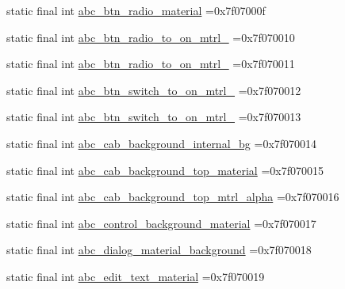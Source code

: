 \begin{DoxyCompactItemize}
\item 
static final int \mbox{\hyperlink{classcom_1_1example_1_1trainawearapplication_1_1_r_1_1drawable_a86ec8f6e96eb8c8e5f4c48fd13214cb6}{abc\+\_\+btn\+\_\+radio\+\_\+material}} =0x7f07000f
\item 
static final int \mbox{\hyperlink{classcom_1_1example_1_1trainawearapplication_1_1_r_1_1drawable_afa1776f1d8f1f59453207683c76dc27f}{abc\+\_\+btn\+\_\+radio\+\_\+to\+\_\+on\+\_\+mtrl\+\_}} =0x7f070010
\item 
static final int \mbox{\hyperlink{classcom_1_1example_1_1trainawearapplication_1_1_r_1_1drawable_a5c54e72bc1da9f1451aabcdb86c208ed}{abc\+\_\+btn\+\_\+radio\+\_\+to\+\_\+on\+\_\+mtrl\+\_}} =0x7f070011
\item 
static final int \mbox{\hyperlink{classcom_1_1example_1_1trainawearapplication_1_1_r_1_1drawable_a0e00952cc0112da28eb55fe4acf87738}{abc\+\_\+btn\+\_\+switch\+\_\+to\+\_\+on\+\_\+mtrl\+\_}} =0x7f070012
\item 
static final int \mbox{\hyperlink{classcom_1_1example_1_1trainawearapplication_1_1_r_1_1drawable_a766b99da32b85b748df3fbe9fe2ab36a}{abc\+\_\+btn\+\_\+switch\+\_\+to\+\_\+on\+\_\+mtrl\+\_}} =0x7f070013
\item 
static final int \mbox{\hyperlink{classcom_1_1example_1_1trainawearapplication_1_1_r_1_1drawable_a9be911f3177f81280c0702aec960bc2b}{abc\+\_\+cab\+\_\+background\+\_\+internal\+\_\+bg}} =0x7f070014
\item 
static final int \mbox{\hyperlink{classcom_1_1example_1_1trainawearapplication_1_1_r_1_1drawable_a2fd726b87bc45358b3127ecd4365f552}{abc\+\_\+cab\+\_\+background\+\_\+top\+\_\+material}} =0x7f070015
\item 
static final int \mbox{\hyperlink{classcom_1_1example_1_1trainawearapplication_1_1_r_1_1drawable_a65c5a6c32883c561d0ecaee754a8b4bd}{abc\+\_\+cab\+\_\+background\+\_\+top\+\_\+mtrl\+\_\+alpha}} =0x7f070016
\item 
static final int \mbox{\hyperlink{classcom_1_1example_1_1trainawearapplication_1_1_r_1_1drawable_a749c2b3b352167aae20aba99cbc3c399}{abc\+\_\+control\+\_\+background\+\_\+material}} =0x7f070017
\item 
static final int \mbox{\hyperlink{classcom_1_1example_1_1trainawearapplication_1_1_r_1_1drawable_abc0c5074d86d2515bdbb347ac2607984}{abc\+\_\+dialog\+\_\+material\+\_\+background}} =0x7f070018
\item 
static final int \mbox{\hyperlink{classcom_1_1example_1_1trainawearapplication_1_1_r_1_1drawable_a48d43e5857067fc0e26a2a9d0fe0a10b}{abc\+\_\+edit\+\_\+text\+\_\+material}} =0x7f070019

\end{DoxyCompactItemize}
